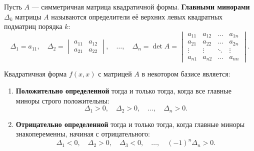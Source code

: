 \begin{definition}
Пусть $A$ --- симметричная матрица квадратичной формы. \textbf{Главными минорами} $\Delta_k$ матрицы $A$ называются определители её верхних левых квадратных подматриц порядка $k$:
\[
\Delta_1 = a_{11}, \quad 
\Delta_2 = \begin{vmatrix} a_{11} & a_{12} \\ a_{21} & a_{22} \end{vmatrix}, \quad \dots, \quad 
\Delta_n = \det A = \begin{vmatrix} 
a_{11} & a_{12} & \dots & a_{1n} \\ 
a_{21} & a_{22} & \dots & a_{2n} \\ 
\vdots & \vdots & \ddots & \vdots \\ 
a_{n1} & a_{n2} & \dots & a_{nn} 
\end{vmatrix}.
\]
\end{definition}

\begin{theorem}
Квадратичная форма $f(x, x)$ с матрицей $A$ в некотором базисе является:
\begin{enumerate}
    \item \textbf{Положительно определенной} тогда и только тогда, когда все главные миноры строго положительны:
    \[
    \Delta_1 > 0, \quad \Delta_2 > 0, \quad \dots, \quad \Delta_n > 0.
    \]
    \item \textbf{Отрицательно определенной} тогда и только тогда, когда главные миноры знакопеременны, начиная с отрицательного:
    \[
    \Delta_1 < 0, \quad \Delta_2 > 0, \quad \Delta_3 < 0, \quad \dots, \quad (-1)^n \Delta_n > 0.
    \]
\end{enumerate}
\end{theorem}

